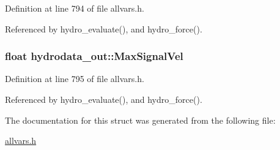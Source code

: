 Definition at line 794 of file allvars.h.



Referenced by hydro\_\-evaluate(), and hydro\_\-force().

\hypertarget{structhydrodata__out_a6f4c65630e80c636a128d59e0afc4dad}{
\subsubsection[{MaxSignalVel}]{\setlength{\rightskip}{0pt plus 5cm}float {\bf hydrodata\_\-out::MaxSignalVel}}}
\label{structhydrodata__out_a6f4c65630e80c636a128d59e0afc4dad}


Definition at line 795 of file allvars.h.



Referenced by hydro\_\-evaluate(), and hydro\_\-force().



The documentation for this struct was generated from the following file:\begin{DoxyCompactItemize}
\item 
\hyperlink{allvars_8h}{allvars.h}\end{DoxyCompactItemize}
